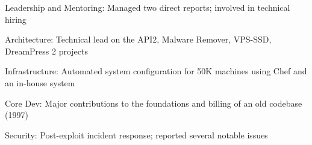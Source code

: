 \item Leadership and Mentoring: Managed two direct reports; involved in technical hiring   
\item Architecture: Technical lead on the API2, Malware Remover, VPS-SSD, DreamPress 2 projects   
\item Infrastructure: Automated system configuration for 50K machines using Chef and an in-house system   
\item Core Dev: Major contributions to the foundations and billing of an old codebase (1997)   
\item Security: Post-exploit incident response; reported several notable issues 
